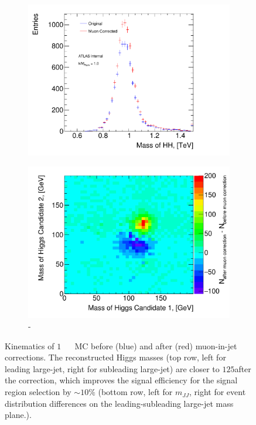 \begin{figure}
\begin{center}
\begin{subfigure}[b]{0.45\textwidth}
        \caption{\msublJ}
        \label{fig:boosted-muons-signal-sublj}
    \end{subfigure}\\
    \captionsetup{justification=centering}
    \begin{subfigure}[b]{0.45\textwidth}
        \includegraphics[width=\textwidth]{figures/boosted/muons/hh_mass_dbl.pdf}
        \caption{\mtwoJ}
        \label{fig:boosted-muons-signal-mjj}
    \end{subfigure}
    \quad
    \begin{subfigure}[b]{0.45\textwidth}
        \includegraphics[width=\textwidth]{figures/boosted/muons/h12_corr_mass.pdf}
        \caption{\mleadJ-\msublJ}
        \label{fig:boosted-muons-signal-mj2d}
    \end{subfigure}
  \caption{Kinematics of $1$\TeV~ \Grav~ MC before (blue) and after (red) muon-in-jet corrections. The reconstructed Higgs masses (top row, left for leading large-\R jet, right for subleading large-\R jet) are closer to $125$\GeV after the correction, which improves the signal efficiency for the signal region selection by $\sim\!10\%$ (bottom row, left for $m_{JJ}$, right for event distribution differences on the leading-subleading large-\R jet mass plane.).}
  \label{fig:boosted-muons-signal}
\end{center}
\end{figure}
